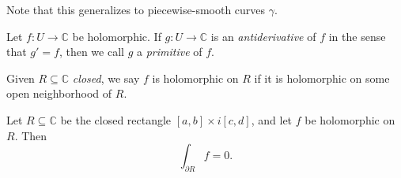 Note that this generalizes to piecewise-smooth curves $\gamma $.


\begin{definition}\label{2.0.1}
	Let $f : U \to \mathbb{C} $ be holomorphic. If $g : U \to \mathbb{C} $ is an \emph{antiderivative} of $f$ in the sense that $g'=f$, then we call $g$ a \emph{primitive} of $f$.
\end{definition}

\begin{terminology}\label{2.0.2}
	Given $R\subseteq \mathbb{C} $ \emph{closed}, we say $f$ is holomorphic on $R$ if it is holomorphic on some open neighborhood of $R$.
\end{terminology}

\begin{theorem}[Goursat]\label{2.0.3}
	Let $R\subseteq \mathbb{C} $ be the closed rectangle $[a,b]\times i[c,d]$, and let $f$ be holomorphic on $R$. Then
	\[
		\int_{\partial R}f=0
	.\]
\end{theorem}
